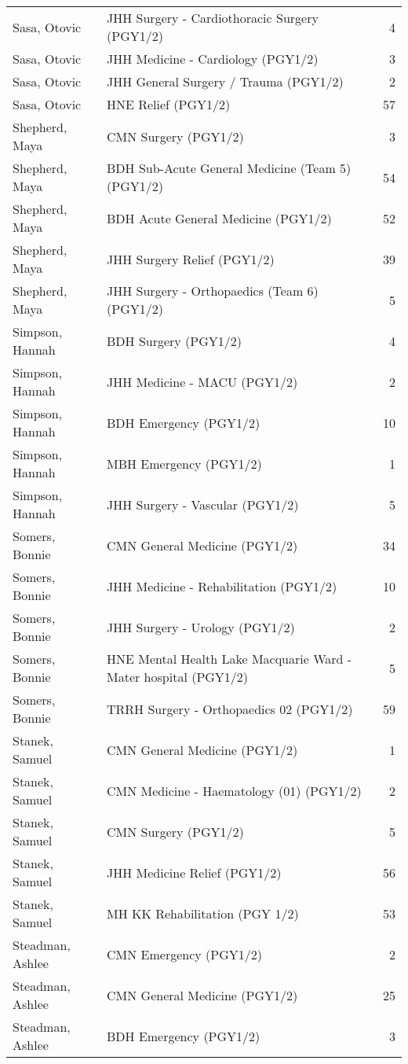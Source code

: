 \documentclass[
]{article}
\begin{document}
\begin{longtable}{llr}
Sasa, Otovic & JHH Surgery - Cardiothoracic Surgery (PGY1/2) & 4 \\ 
Sasa, Otovic & JHH Medicine - Cardiology (PGY1/2) & 3 \\ 
Sasa, Otovic & JHH General Surgery / Trauma (PGY1/2) & 2 \\ 
Sasa, Otovic & HNE Relief (PGY1/2) & 57 \\ 
Shepherd, Maya & CMN Surgery (PGY1/2) & 3 \\ 
Shepherd, Maya & BDH Sub-Acute General Medicine (Team 5) (PGY1/2) & 54 \\ 
Shepherd, Maya & BDH Acute General Medicine (PGY1/2) & 52 \\ 
Shepherd, Maya & JHH Surgery Relief (PGY1/2) & 39 \\ 
Shepherd, Maya & JHH Surgery - Orthopaedics (Team 6) (PGY1/2) & 5 \\ 
Simpson, Hannah & BDH Surgery (PGY1/2) & 4 \\ 
Simpson, Hannah & JHH Medicine - MACU (PGY1/2) & 2 \\ 
Simpson, Hannah & BDH Emergency (PGY1/2) & 10 \\ 
Simpson, Hannah & MBH Emergency (PGY1/2) & 1 \\ 
Simpson, Hannah & JHH Surgery - Vascular (PGY1/2) & 5 \\ 
Somers, Bonnie & CMN General Medicine (PGY1/2) & 34 \\ 
Somers, Bonnie & JHH Medicine - Rehabilitation (PGY1/2) & 10 \\ 
Somers, Bonnie & JHH Surgery - Urology (PGY1/2) & 2 \\ 
Somers, Bonnie & HNE Mental Health Lake Macquarie Ward - Mater hospital (PGY1/2) & 5 \\ 
Somers, Bonnie & TRRH Surgery - Orthopaedics 02 (PGY1/2) & 59 \\ 
Stanek, Samuel & CMN General Medicine (PGY1/2) & 1 \\ 
Stanek, Samuel & CMN Medicine - Haematology (01) (PGY1/2) & 2 \\ 
Stanek, Samuel & CMN Surgery (PGY1/2) & 5 \\ 
Stanek, Samuel & JHH Medicine Relief (PGY1/2) & 56 \\ 
Stanek, Samuel & MH KK Rehabilitation (PGY 1/2) & 53 \\ 
Steadman, Ashlee & CMN Emergency (PGY1/2) & 2 \\ 
Steadman, Ashlee & CMN General Medicine (PGY1/2) & 25 \\ 
Steadman, Ashlee & BDH Emergency (PGY1/2) & 3 \\ 

\end{longtable}
\end{document}
